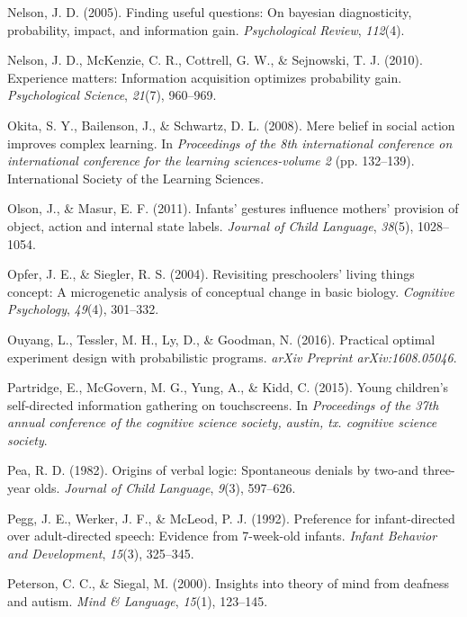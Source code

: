 \documentclass[english,floatsintext,man]{apa6}
\theoremstyle{definition}
\theoremstyle{definition}
\theoremstyle{definition}
\theoremstyle{remark}
\begin{document}
\hypertarget{ref-nelson2005finding}{}
Nelson, J. D. (2005). Finding useful questions: On bayesian
diagnosticity, probability, impact, and information gain.
\emph{Psychological Review}, \emph{112}(4).

\hypertarget{ref-nelson2010experience}{}
Nelson, J. D., McKenzie, C. R., Cottrell, G. W., \& Sejnowski, T. J.
(2010). Experience matters: Information acquisition optimizes
probability gain. \emph{Psychological Science}, \emph{21}(7), 960--969.

\hypertarget{ref-okita2008mere}{}
Okita, S. Y., Bailenson, J., \& Schwartz, D. L. (2008). Mere belief in
social action improves complex learning. In \emph{Proceedings of the 8th
international conference on international conference for the learning
sciences-volume 2} (pp. 132--139). International Society of the Learning
Sciences.

\hypertarget{ref-olson2011infants}{}
Olson, J., \& Masur, E. F. (2011). Infants' gestures influence mothers'
provision of object, action and internal state labels. \emph{Journal of
Child Language}, \emph{38}(5), 1028--1054.

\hypertarget{ref-opfer2004revisiting}{}
Opfer, J. E., \& Siegler, R. S. (2004). Revisiting preschoolers' living
things concept: A microgenetic analysis of conceptual change in basic
biology. \emph{Cognitive Psychology}, \emph{49}(4), 301--332.

\hypertarget{ref-ouyang2016practical}{}
Ouyang, L., Tessler, M. H., Ly, D., \& Goodman, N. (2016). Practical
optimal experiment design with probabilistic programs. \emph{arXiv
Preprint arXiv:1608.05046}.

\hypertarget{ref-partridge2015young}{}
Partridge, E., McGovern, M. G., Yung, A., \& Kidd, C. (2015). Young
children's self-directed information gathering on touchscreens. In
\emph{Proceedings of the 37th annual conference of the cognitive science
society, austin, tx. cognitive science society}.

\hypertarget{ref-pea1982origins}{}
Pea, R. D. (1982). Origins of verbal logic: Spontaneous denials by
two-and three-year olds. \emph{Journal of Child Language}, \emph{9}(3),
597--626.

\hypertarget{ref-pegg1992preference}{}
Pegg, J. E., Werker, J. F., \& McLeod, P. J. (1992). Preference for
infant-directed over adult-directed speech: Evidence from 7-week-old
infants. \emph{Infant Behavior and Development}, \emph{15}(3), 325--345.

\hypertarget{ref-peterson2000insights}{}
Peterson, C. C., \& Siegal, M. (2000). Insights into theory of mind from
deafness and autism. \emph{Mind \& Language}, \emph{15}(1), 123--145.
\end{document}
